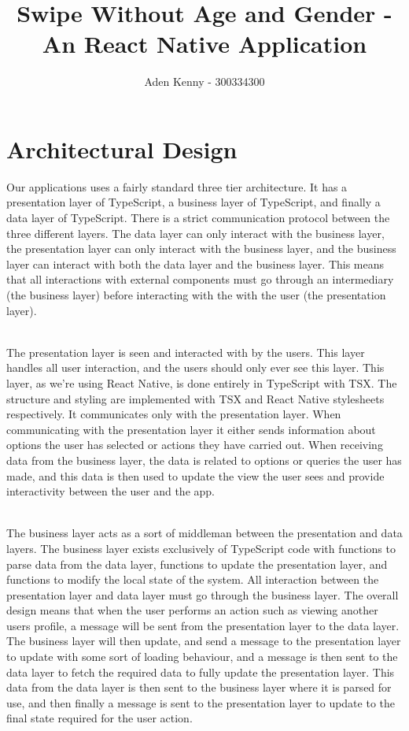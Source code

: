 \documentclass[a4paper, 11pt]{article}
\begin{document}
\title{Swipe Without Age and Gender - An React Native Application}
\author{
Aden Kenny - 300334300
}

\maketitle



\section{Architectural Design}

Our applications uses a fairly standard three tier architecture. It has a presentation layer of TypeScript, a business layer of TypeScript, and finally a data layer of TypeScript. There is a strict communication protocol between the three different layers. The data layer can only interact with the business layer, the presentation layer can only interact with the business layer, and the business layer can interact with both the data layer and the business layer. This means that all interactions with external components must go through an intermediary (the business layer) before interacting with the with the user (the presentation layer).

~\\
The presentation layer is seen and interacted with by the users. This layer handles all user interaction, and the users should only ever see this layer. This layer, as we're using React Native, is done entirely in TypeScript with TSX. The structure and styling are implemented with TSX and React Native stylesheets respectively. It communicates only with the presentation layer. When communicating with the presentation layer it either sends information about options the user has selected or actions they have carried out. When receiving data from the business layer, the data is related to options or queries the user has made, and this data is then used to update the view the user sees and provide interactivity between the user and the app.

~\\
The business layer acts as a sort of middleman between the presentation and data layers. The business layer exists exclusively of TypeScript code with functions to parse data from the data layer, functions to update the presentation layer, and functions to modify the local state of the system. All interaction between the presentation layer and data layer must go through the business layer. The overall design means that when the user performs an action such as viewing another users profile, a message will be sent from the presentation layer to the data layer. The business layer will then update, and send a message to the presentation layer to update with some sort of loading behaviour, and a message is then sent to the data layer to fetch the required data to fully update the presentation layer. This data from the data layer is then sent to the business layer where it is parsed for use, and then finally a message is sent to the presentation layer to update to the final state required for the user action.
\end{document}
